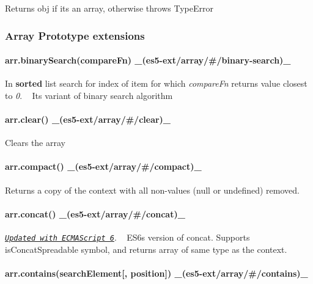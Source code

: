 Returns {\ttfamily obj} if it\textquotesingle{}s an array, otherwise throws {\ttfamily Type\+Error}

\subsubsection*{Array Prototype extensions}

\paragraph*{arr.\+binary\+Search(compare\+Fn) \+\_\+(es5-\/ext/array/\#/binary-\/search)\+\_\+}

In {\bfseries sorted} list search for index of item for which {\itshape compare\+Fn} returns value closest to {\itshape 0}. ~\newline
It\textquotesingle{}s variant of binary search algorithm

\paragraph*{arr.\+clear() \+\_\+(es5-\/ext/array/\#/clear)\+\_\+}

Clears the array

\paragraph*{arr.\+compact() \+\_\+(es5-\/ext/array/\#/compact)\+\_\+}

Returns a copy of the context with all non-\/values ({\ttfamily null} or {\ttfamily undefined}) removed.

\paragraph*{arr.\+concat() \+\_\+(es5-\/ext/array/\#/concat)\+\_\+}

\href{http://people.mozilla.org/~jorendorff/es6-draft.html#sec-array.prototype.concat}{\tt {\itshape Updated with E\+C\+M\+A\+Script 6}}. ~\newline
E\+S6\textquotesingle{}s version of {\ttfamily concat}. Supports {\ttfamily is\+Concat\+Spreadable} symbol, and returns array of same type as the context.

\paragraph*{arr.\+contains(search\+Element\mbox{[}, position\mbox{]}) \+\_\+(es5-\/ext/array/\#/contains)\+\_\+}

